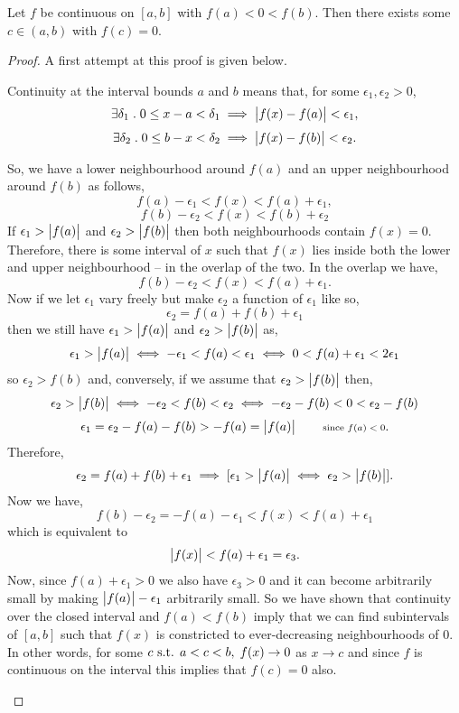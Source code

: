 \documentclass[../MathsNotesBase.tex]{subfiles}
\begin{document}
	\begin{lemma}
		Let $f$ be continuous on ${ [a,b] }$ with ${ f(a) < 0 < f(b) }$. Then there exists some ${ c \in (a,b) }$ with ${ f(c) = 0 }$.
	\end{lemma}
	\begin{proof}
		A first attempt at this proof is given below.\\
		\begin{displayquote}
			Continuity at the interval bounds $a$ and $b$ means that, for some ${ \epsilon_1, \epsilon_2 > 0 }$,
			\[ \exists \delta_1 \;.\; 0 \leq x - a < \delta_1 \implies \left\lvert f(x) - f(a)\right\rvert < \epsilon_1, \]
			\[ \exists \delta_2 \;.\; 0 \leq b - x < \delta_2 \implies \left\lvert f(x) - f(b)\right\rvert < \epsilon_2. \]
			
			So, we have a lower neighbourhood around $f(a)$ and an upper neighbourhood around $f(b)$ as follows,
			\[ f(a) - \epsilon_1 < f(x) < f(a) + \epsilon_1, \]
			\[ f(b) - \epsilon_2 < f(x) < f(b) + \epsilon_2 \]
			If ${ \epsilon_1 > \left\lvert f(a)\right\rvert }$ and ${ \epsilon_2 > \left\lvert f(b)\right\rvert }$ then both neighbourhoods contain ${ f(x) = 0 }$. Therefore, there is some interval of $x$ such that ${ f(x) }$ lies inside both the lower and upper neighbourhood -- in the overlap of the two. In the overlap we have,
			\[ f(b) - \epsilon_2 < f(x) < f(a) + \epsilon_1. \]
			Now if we let $\epsilon_1$ vary freely but make $\epsilon_2$ a function of $\epsilon_1$ like so,
			\[ \epsilon_2 = f(a) + f(b) + \epsilon_1 \]
			then we still have ${ \epsilon_1 > \left\lvert f(a)\right\rvert }$ and ${ \epsilon_2 > \left\lvert f(b)\right\rvert }$ as,
			\[ \epsilon_1 > \left\lvert f(a)\right\rvert \iff -\epsilon_1 < f(a) < \epsilon_1 \iff 0 < f(a) + \epsilon_1 < 2\epsilon_1 \]
			so ${ \epsilon_2 > f(b) }$ and, conversely, if we assume that ${ \epsilon_2 > \left\lvert f(b)\right\rvert }$ then,
			\[ \epsilon_2 > \left\lvert f(b)\right\rvert \iff -\epsilon_2 < f(b) < \epsilon_2 \iff -\epsilon_2 - f(b) < 0 < \epsilon_2 - f(b) \]
			\[ \epsilon_1 = \epsilon_2 - f(a) - f(b) > -f(a) = \left\lvert f(a)\right\rvert \hspace{20pt}\text{\scriptsize{since ${ f(a) < 0 }$}}. \]
			Therefore,
			\[ \epsilon_2 = f(a) + f(b) + \epsilon_1 \implies [ \epsilon_1 > \left\lvert f(a)\right\rvert \iff \epsilon_2 > \left\lvert f(b)\right\rvert ]. \]
			Now we have,
			\[ f(b) - \epsilon_2 = -f(a) - \epsilon_1 < f(x) < f(a) + \epsilon_1 \]
			which is equivalent to
			\[ \left\lvert f(x)\right\rvert < f(a) + \epsilon_1 = \epsilon_3. \]
			Now, since ${ f(a) + \epsilon_1 > 0 }$ we also have ${ \epsilon_3 > 0 }$ and it can become arbitrarily small by making ${ \left\lvert f(a)\right\rvert - \epsilon_1 }$ arbitrarily small. So we have shown that continuity over the closed interval and ${ f(a) < f(b) }$ imply that we can find subintervals of ${ [a,b] }$ such that ${ f(x) }$ is constricted to ever-decreasing neighbourhoods of 0. In other words, for some ${c \text{ s.t. } a < c < b, \; f(x) \to 0 }$ as  ${ x \to c }$ and since $f$ is continuous on the interval this implies that ${ f(c) = 0 }$ also. 

\end{displayquote}
\end{proof}
\end{document}
